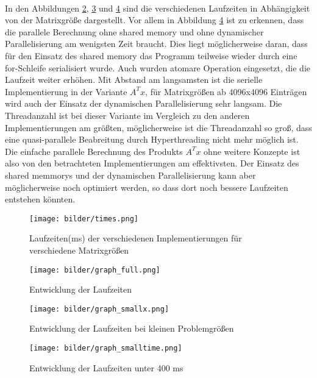 \documentclass[11pt]{scrreprt}
\begin{document}
\\
In den Abbildungen \ref{im:graph_full}, \ref{im:graph_smallx} und \ref{im:graph_smalltime} sind die verschiedenen Laufzeiten in Abhängigkeit von der Matrixgröße dargestellt. Vor allem in Abbildung \ref{im:graph_smalltime} ist zu erkennen, dass die parallele Berechnung ohne shared memory und ohne dynamischer Parallelisierung am wenigsten Zeit braucht. Dies liegt möglicherweise daran, dass für den Einsatz des shared memory das Programm teilweise wieder durch eine for-Schleife serialisiert wurde. Auch wurden atomare Operation eingesetzt, die die Laufzeit weiter erhöhen. Mit Abstand am langsamsten ist die serielle Implementierung in der Variante $A^Tx$, für Matrixgrößen ab 4096x4096 Einträgen wird auch der Einsatz der dynamischen Parallelisierung sehr langsam. Die Threadanzahl ist bei dieser Variante im Vergleich zu den anderen Implementierungen am größten, möglicherweise ist die Threadanzahl so groß, dass eine quasi-parallele Beabreitung durch Hyperthreading nicht mehr möglich ist.
\\
Die einfache parallele Berechnung des Produkts $A^Tx$ ohne weitere Konzepte ist also von den betrachteten Implementierungen am effektivsten. Der Einsatz des shared memmorys und der dynamischen Parallelisierung kann aber möglicherweise noch optimiert werden, so dass dort noch bessere Laufzeiten entstehen könnten.


\begin{figure}
\texttt{[image: bilder/times.png]}
\caption{Laufzeiten(ms) der verschiedenen Implementierungen für verschiedene Matrixgrößen}\label{im:times}
\end{figure}
\begin{figure}
\texttt{[image: bilder/graph\_full.png]}
\caption{Entwicklung der Laufzeiten}
\label{im:graph_full}
\end{figure}
\begin{figure}
\texttt{[image: bilder/graph\_smallx.png]}
\caption{Entwicklung der Laufzeiten bei kleinen Problemgrößen}
\label{im:graph_smallx}
\end{figure}
\begin{figure}
\texttt{[image: bilder/graph\_smalltime.png]}
\caption{Entwicklung der Laufzeiten unter 400 ms}
\label{im:graph_smalltime}
\end{figure}
\end{document}
